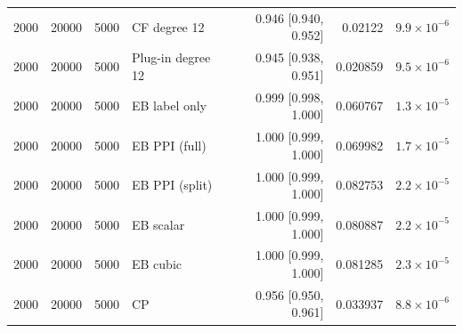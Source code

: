 {\begin{longtable}{rrrlrrr}
2000 & 20000 & 5000 & CF degree 12 & 0.946 [0.940, 0.952] & 0.02122 & $9.9\times 10^{-6}$ \\
2000 & 20000 & 5000 & Plug-in degree 12 & 0.945 [0.938, 0.951] & 0.020859 & $9.5\times 10^{-6}$ \\
2000 & 20000 & 5000 & EB label only & 0.999 [0.998, 1.000] & 0.060767 & $1.3\times 10^{-5}$ \\
2000 & 20000 & 5000 & EB PPI (full) & 1.000 [0.999, 1.000] & 0.069982 & $1.7\times 10^{-5}$ \\
2000 & 20000 & 5000 & EB PPI (split) & 1.000 [0.999, 1.000] & 0.082753 & $2.2\times 10^{-5}$ \\
2000 & 20000 & 5000 & EB scalar & 1.000 [0.999, 1.000] & 0.080887 & $2.2\times 10^{-5}$ \\
2000 & 20000 & 5000 & EB cubic & 1.000 [0.999, 1.000] & 0.081285 & $2.3\times 10^{-5}$ \\
2000 & 20000 & 5000 & CP & 0.956 [0.950, 0.961] & 0.033937 & $8.8\times 10^{-6}$ \\
\end{longtable}}
